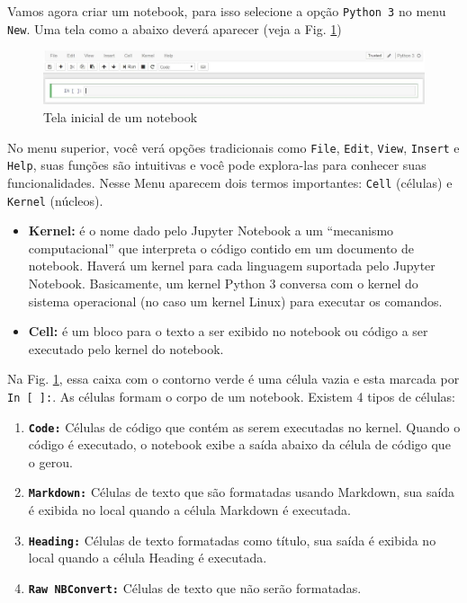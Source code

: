 Vamos agora criar um notebook, para isso selecione a opção {\tt Python 3} no menu {\tt New}. Uma tela como a abaixo deverá aparecer (veja a Fig. \ref{fig:JN-Notebook})
\begin{figure}[h!]
\centering
\includegraphics[scale=0.3]{Images/new-notebook.jpg}
\caption{Tela inicial de um notebook}\label{fig:JN-Notebook}
\end{figure}
No menu superior, você verá opções tradicionais como {\tt File}, {\tt Edit}, {\tt View}, {\tt Insert} e {\tt Help}, suas funções são intuitivas e você pode explora-las para conhecer suas funcionalidades. Nesse Menu aparecem dois termos importantes: {\tt Cell} (células) e {\tt Kernel} (núcleos).
\begin{itemize}
    \item {\bf Kernel:} é o nome dado pelo Jupyter Notebook a um “mecanismo computacional” que interpreta o código contido em um documento de notebook. Haverá um kernel para cada linguagem suportada pelo Jupyter Notebook. Basicamente, um kernel Python 3 conversa com o kernel do sistema operacional (no caso um kernel Linux) para executar os comandos.
    \item {\bf Cell:} é um bloco para o texto a ser exibido no notebook ou código a ser executado pelo kernel do notebook.
\end{itemize}
Na Fig. \ref{fig:JN-Notebook}, essa caixa com o contorno verde é uma célula vazia e esta marcada por {\tt In [ ]:}. As células formam o corpo de um notebook.  Existem 4 tipos de células: 
\begin{enumerate}
    \item {\bf \tt Code:} Células de código que contém as serem executadas no kernel. Quando o código é executado, o notebook exibe a saída abaixo da célula de código que o gerou.
    \item {\bf \tt Markdown:} Células de texto que são formatadas usando Markdown, sua saída é exibida no local quando a célula Markdown é executada.
    \item {\bf \tt Heading:} Células de texto formatadas como título, sua saída é exibida no local quando a célula Heading é executada.
    \item {\bf \tt Raw NBConvert:} Células de texto que não serão formatadas.
\end{enumerate}
